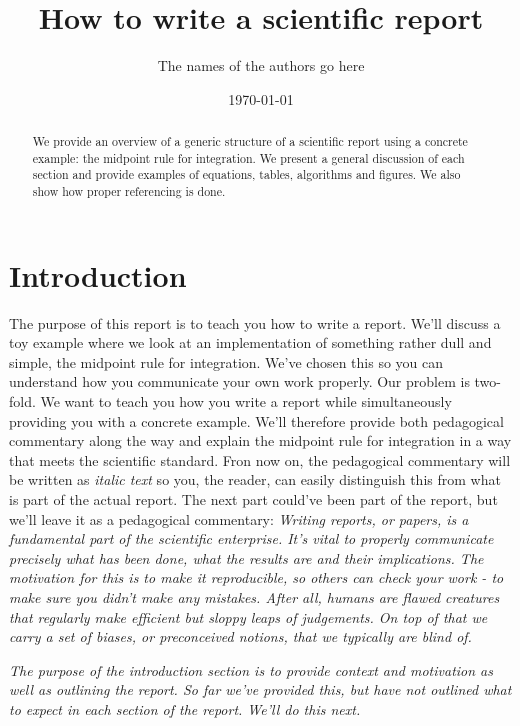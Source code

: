 \documentclass[english,notitlepage, reprint]{revtex4-1}  %
\begin{document}
\title{How to write a scientific report}      %
\author{The names of the authors go here}          %
\date{\today}                             %
\noaffiliation                            %

\begin{abstract}
	We provide an overview of a generic structure of a scientific report using a concrete example: the midpoint rule for integration. We present a general discussion of each section and provide examples of equations, tables, algorithms and figures. We also show how proper referencing is done.
\end{abstract}
\maketitle 

\section{Introduction}
The purpose of this report is to teach you how to write a report. We'll discuss a toy example where we look at an implementation of something rather dull and simple, the midpoint rule for integration. We've chosen this so you can understand how you communicate your own work properly. Our problem is two-fold. We want to teach you how you write a report while simultaneously providing you with a concrete example. We'll therefore provide both pedagogical commentary along the way and explain the midpoint rule for integration in a way that meets the scientific standard. Fron now on, the pedagogical commentary will be written as \textit{italic text} so you, the reader, can easily distinguish this from what is part of the actual report. The next part could've been part of the report, but we'll leave it as a pedagogical commentary:
\textit{Writing reports, or papers, is a fundamental part of the scientific enterprise. It's vital to properly communicate precisely what has been done, what the results are and their implications. The motivation for this is to make it reproducible, so others can check your work - to make sure you didn't make any mistakes. After all, humans are flawed creatures that regularly make efficient but sloppy leaps of judgements. On top of that we carry a set of biases, or preconceived notions, that we typically are blind of.}

\textit{The purpose of the introduction section is to provide context and motivation as well as outlining the report. So far we've provided this, but have not outlined what to expect in each section of the report. We'll do this next.}
\end{document}
